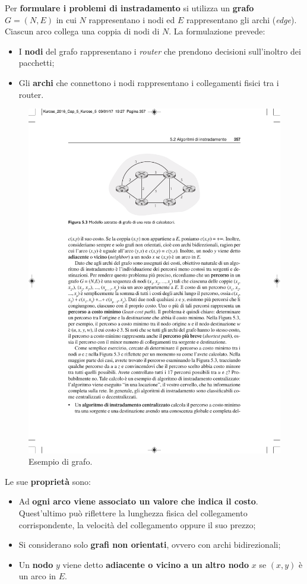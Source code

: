 \documentclass[a4paper]{article}
\begin{document}
	\noindent
	Per \textbf{formulare i problemi di instradamento} si utilizza un \textbf{grafo} $G=\left(N,E\right)$ in cui $N$ rappresentano i nodi ed $E$ rappresentano gli archi (\emph{edge}). Ciascun arco collega una coppia di nodi di $N$. La formulazione prevede:
	\begin{itemize}
		\item I \textbf{nodi} del grafo rappresentano i \emph{router} che prendono decisioni sull’inoltro dei pacchetti;
		
		\item Gli \textbf{archi} che connettono i nodi rappresentano i collegamenti fisici tra i router.
	\end{itemize}
	\begin{figure}[!htp]
		\centering
		\includegraphics[width=.8\textwidth]{img/eg_grafo_instradamento.pdf}
		\caption{Esempio di grafo.}
	\end{figure}

	\noindent
	Le sue \textbf{proprietà} sono:
	\begin{itemize}
		\item Ad \textbf{ogni arco viene associato un valore che indica il costo}. Quest’ultimo può riflettere la lunghezza fisica del collegamento corrispondente, la velocità del collegamento oppure il suo prezzo;
		\item Si considerano solo \textbf{grafi non orientati}, ovvero con archi bidirezionali;
		\item Un \textbf{nodo} $y$ viene detto \textbf{adiacente o vicino a un altro nodo} $x$ se $\left(x,y\right)$ è un arco in $E$.
	\end{itemize}\newpage
\end{document}
